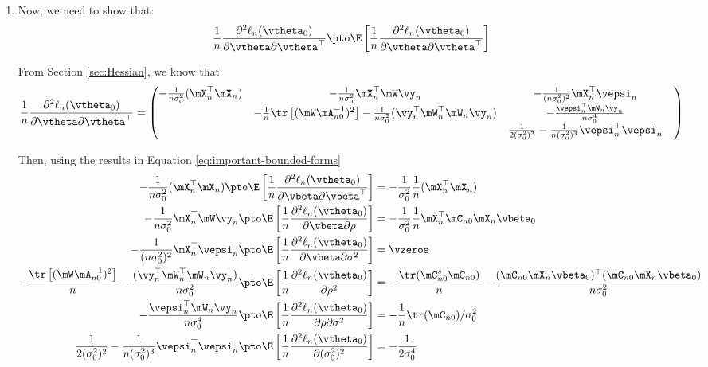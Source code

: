 \documentclass[english,12pt]{book}\usepackage[]{graphicx}\usepackage[]{xcolor}
\begin{document}
\begin{subappendices}
\begin{enumerate}
   \item Now, we need to show that:
   \begin{equation*}
     \frac{1}{n}\frac{\partial^2 \ell_n(\vtheta_0)}{\partial \vtheta \partial \vtheta^\top}\pto \E\left[\frac{1}{n}\frac{\partial^2 \ell_n(\vtheta_0)}{\partial \vtheta \partial \vtheta^\top}\right]
   \end{equation*}
   
   From Section \ref{sec:Hessian}, we know that 
\begin{equation}\label{eq:hessian_sml2}
\frac{1}{n}\frac{\partial^2 \ell_n(\vtheta_0)}{\partial \vtheta \partial \vtheta^\top}= 
	\begin{pmatrix}
	- \frac{1}{n\sigma^2_0}(\mX_n^\top \mX_n)  & - \frac{1}{n\sigma^2_0} \mX_n^\top \mW\vy_n & - \frac{1}{(n\sigma^2_0)^2} \mX_n^\top \vepsi_n\\
	& - \frac{1}{n}\tr\left[(\mW\mA_{n0}^{-1})^2\right] - \frac{1}{n\sigma^2_0}(\vy_n^{\top}\mW_n^{\top}\mW_n\vy_n) & -\frac{\vepsi_n^\top\mW_n\vy_n}{n\sigma^4_0} \\
		  & &  \frac{1}{2(\sigma^2_0) ^2} - \frac{1}{n(\sigma^2_0)^3} \vepsi_n^\top \vepsi_n &  \\
	\end{pmatrix} 
\end{equation}

Then, using the results in Equation \eqref{eq:important-bounded-forms}
\begin{equation}
\begin{aligned}
	- \frac{1}{n\sigma^2_0}(\mX_n^\top \mX_n) \pto \E\left[\frac{1}{n}\frac{\partial^2  \ell_n(\vtheta_0)}{\partial \vbeta \partial \vbeta^\top}\right] & = -\frac{1}{\sigma^2_0}\frac{1}{n}(\mX_n^\top\mX_n) \\
	- \frac{1}{n\sigma^2_0} \mX_n^\top \mW\vy_n \pto \E\left[\frac{1}{n}\frac{\partial^2  \ell_n(\vtheta_0)}{\partial \vbeta \partial \rho} \right] & = - \frac{1}{\sigma^2_0} \frac{1}{n}\mX_n^\top\mC_{n0}\mX_n\vbeta_0 \\
	- \frac{1}{(n\sigma^2_0)^2} \mX_n^\top \vepsi_n\pto \E\left[\frac{1}{n}\frac{\partial^2  \ell_n(\vtheta_0)}{\partial \vbeta \partial \sigma^2}\right] & = \vzeros \\
	- \frac{\tr\left[(\mW\mA_{n0}^{-1})^2\right]}{n} - \frac{(\vy_n^{\top}\mW_n^{\top}\mW_n\vy_n)}{n\sigma^2_0} \pto  \E\left[\frac{1}{n}\frac{\partial^2 \ell_n(\vtheta_0)}{\partial \rho ^2}\right] & = - \frac{\tr(\mC^s_{n0}\mC_{n0})}{n} - \frac{(\mC_{n0}\mX_n\vbeta_0)^\top(\mC_{n0}\mX_n\vbeta_0)}{n\sigma^2_0} \\
	-\frac{\vepsi_n^\top\mW_n\vy_n}{n\sigma^4_0} \pto  \E\left[\frac{1}{n}\frac{\partial^2 \ell_n(\vtheta_0)}{ \partial \rho \partial \sigma^2}\right] & = - \frac{1}{n}\tr(\mC_{n0})/\sigma^2_0 \\
	\frac{1}{2(\sigma^2_0) ^2} - \frac{1}{n(\sigma^2_0)^3} \vepsi_n^\top \vepsi_n \pto  \E\left[\frac{1}{n}\frac{\partial^2 \ell_n(\vtheta_0)}{\partial (\sigma^2_0)^2}\right] & = - \frac{1}{2\sigma^4_0} 
	\end{aligned}
\end{equation}
   

\end{enumerate}
\end{subappendices}
\end{document}
